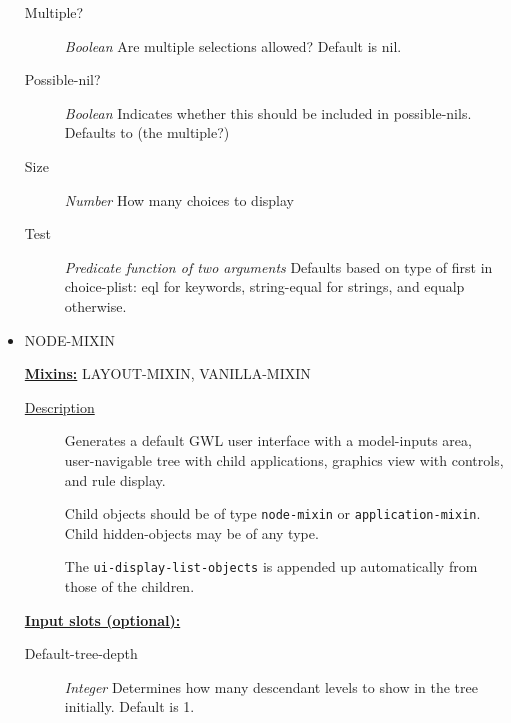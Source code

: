 \documentclass [11pt]{book}
\begin{document}
\begin{itemize}
\begin{description}
\item [Multiple?]
\emph{Boolean} Are multiple selections allowed? Default is nil.


\item [Possible-nil?]
\emph{Boolean} Indicates whether this should be included in possible-nils. Defaults to (the multiple?)


\item [Size]
\emph{Number} How many choices to display


\item [Test]
\emph{Predicate function of two arguments} Defaults based on type of first in choice-plist:
eql for keywords, string-equal for strings, and equalp otherwise.


\end{description}







\item {}NODE-MIXIN


\textbf{
\underline{Mixins:}} LAYOUT-MIXIN, VANILLA-MIXIN





\begin{description}

\item [
\underline{Description}]


Generates a default GWL user interface with a model-inputs area,
user-navigable tree with child applications, graphics view with controls, and rule display. 

Child objects should be of type \texttt{node-mixin} or \texttt{application-mixin}. Child hidden-objects
may be of any type.

The \texttt{ui-display-list-objects} is appended up automatically from those of the children.



\end{description}








\textbf{
\underline{Input slots (optional):}}

\begin{description}

\item [Default-tree-depth]
\emph{Integer} Determines how many descendant levels to show in the tree initially. Default is 1.



\end{description}
\end{itemize}
\end{document}
